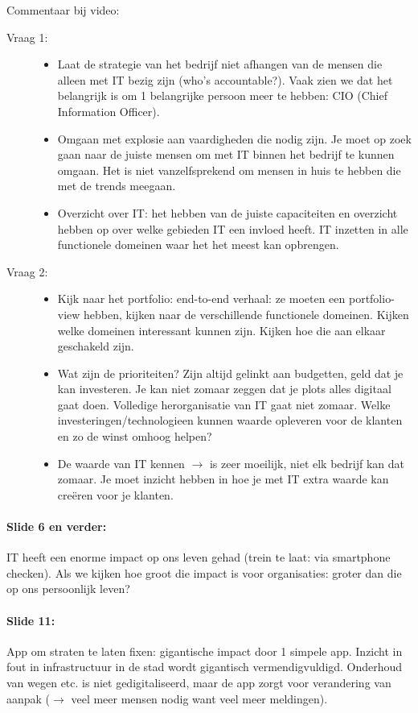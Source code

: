 \documentclass[10pt,a4paper]{report}
\begin{document}
Commentaar bij video: 
\begin{description}
\item[Vraag 1:] 
\begin{itemize}
\item Laat de strategie van het bedrijf niet afhangen van de mensen die alleen met IT bezig zijn (who's accountable?). Vaak zien we dat het belangrijk is om 1 belangrijke persoon meer te hebben: CIO (Chief Information Officer). 
\item Omgaan met explosie aan vaardigheden die nodig zijn. Je moet op zoek gaan naar de juiste mensen om met IT binnen het bedrijf te kunnen omgaan. Het is niet vanzelfsprekend om mensen in huis te hebben die met de trends meegaan. 
\item Overzicht over IT: het hebben van de juiste capaciteiten en overzicht hebben op over welke gebieden IT een invloed heeft. IT inzetten in alle functionele domeinen waar het het meest kan opbrengen.  
\end{itemize}
\item[Vraag 2:] 
\begin{itemize}
\item Kijk naar het portfolio: end-to-end verhaal: ze moeten een portfolio-view hebben, kijken naar de verschillende functionele domeinen. Kijken welke domeinen interessant kunnen zijn. Kijken hoe die aan elkaar geschakeld zijn. 
\item Wat zijn de prioriteiten? Zijn altijd gelinkt aan budgetten, geld dat je kan investeren. Je kan niet zomaar zeggen dat je plots alles digitaal gaat doen. Volledige herorganisatie van IT gaat niet zomaar. Welke investeringen/technologieen kunnen waarde opleveren voor de klanten en zo de winst omhoog helpen? 
\item De waarde van IT kennen $\rightarrow$ is zeer moeilijk, niet elk bedrijf kan dat zomaar. Je moet inzicht hebben in hoe je met IT extra waarde kan cre\"eren voor je klanten.
\end{itemize}
\end{description}


\paragraph{Slide 6 en verder:}IT heeft een enorme impact op ons leven gehad (trein te laat: via smartphone checken). Als we kijken hoe groot die impact is voor organisaties: groter dan die op ons persoonlijk leven? 

\paragraph{Slide 11:}App om straten te laten fixen: gigantische impact door 1 simpele app. Inzicht in fout in infrastructuur in de stad wordt gigantisch vermendigvuldigd. Onderhoud van wegen etc. is niet gedigitaliseerd, maar de app zorgt voor verandering van aanpak ($\rightarrow$ veel meer mensen nodig want veel meer meldingen). 
\end{document}
